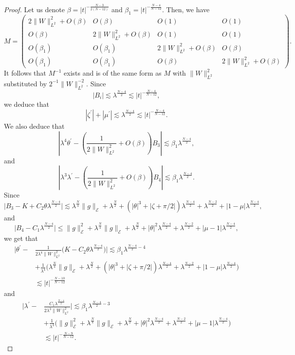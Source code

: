 \documentclass[a4paper,two-side,10pt]{amsart}
\numberwithin{equation}{section}
\begin{document}
\begin{proof}
Let us denote $\beta=|t|^{-\frac{N-3}{2(N-12)}}$ and $\beta_1=|t|^{-\frac{N-4}{N-12}}$.
Then, we have
$$M=\begin{pmatrix}2\|W\|_{L^2}^2 +O(\beta) & O(\beta) & O(1) & O(1)\\ O(\beta) & 2\|W\|_{L^2}^2 +O(\beta) & O(1) & O(1)\\ O(\beta_1) &O(\beta_1) & 2\|W\|_{L^2}^2+O(\beta) & O(\beta) \\ O(\beta_1) & O(\beta_1) &O(\beta) &   2\|W\|_{L^2}^2+O(\beta)  \end{pmatrix}.$$
It follows that $M^{-1}$ exists and is of the same form as $M$ with $\|W\|_{L^2}^2$ substituted by $2^{-1}\|W\|_{L^2}^{-2}$. Since 
$$|B_i| \lesssim \lambda^{\frac{N-4}{2}}
\lesssim  |t|^{-\frac{N-4}{N-12}},$$
we deduce that 
\begin{equation}\label{zetamu}
|\zeta^\prime| +|\mu^\prime|\lesssim \lambda^{\frac{N-4}{2}}\lesssim |t|^{-\frac{N-4}{N-12}}.
\end{equation}
 We also deduce that
$$\left|\lambda^4 \theta^\prime - \left(\frac{1}{2\|W\|_{L^2}^2} +O(\beta)\right) B_3 \right|\lesssim \beta_1 \lambda^{\frac{N-4}{2}},$$
and
$$\left|\lambda^3 \lambda^\prime - \left(\frac{1}{2\|W\|_{L^2}^2} +O(\beta)\right) B_4 \right|\lesssim \beta_1 \lambda^{\frac{N-4}{2}}.$$
Since 
$$\big|B_3 - K+ C_2 \theta \lambda^{\frac{N-4}{2}}\big| \lesssim  \lambda^{\frac{N}{4} } \|g\|_{\mathcal{E}} +\lambda^{\frac{N}{2}}+  ( |\theta|^3 + |\zeta +\pi /2| ) \lambda^{\frac{N-4}{2}} +  \lambda^{\frac{N-2}{2}} +|1-\mu| \lambda^{\frac{N-4}{2}},$$
 and
$$\big|B_4- C_1 \lambda^{\frac{N-4}{2}}\big|\leq \|g\|^2_{\mathcal{E}} + \lambda^{\frac{N}{4}} \|g\|_{\mathcal{E}}+ \lambda^{\frac{N}{2}}+ |\theta|^2 \lambda^{\frac{N-4}{2}}+\lambda^{\frac{N-2}{2}} + |\mu -1| \lambda^{\frac{N-4}{2}},$$ 
we get that
\begin{align*}
\Big|\theta^\prime -&\frac{1}{2\lambda^4 \|W\|_{L^2}^2} \big(K- C_2 \theta \lambda^{\frac{N-4}{2}}\big) \Big| \lesssim \beta_1 \lambda^{\frac{N-4}{2} -4}\\
&+  \frac{1}{\lambda^4}\big(\lambda^{\frac{N}{4} } \|g\|_{\mathcal{E}} +\lambda^{\frac{N}{2}}+  ( |\theta|^3 + |\zeta +\pi /2| ) \lambda^{\frac{N-4}{2}} +  \lambda^{\frac{N-2}{2}} +|1-\mu| \lambda^{\frac{N-4}{2}} \big)  \\
&\lesssim |t|^{-\frac{N-10}{N-12}}
\end{align*}
and
\begin{align*}
\Big|\lambda^\prime -& \frac{C_1\lambda^{\frac{N-4}{2}}}{2\lambda^3 \|W\|_{L^2}^2} \Big| \lesssim \beta_1 \lambda^{\frac{N-4}{2}-3}\\
&+\frac{1}{\lambda^3} \big(\|g\|^2_{\mathcal{E}} + \lambda^{\frac{N}{4}} \|g\|_{\mathcal{E}}+ \lambda^{\frac{N}{2}}+ |\theta|^2 \lambda^{\frac{N-4}{2}}+\lambda^{\frac{N-2}{2}} + |\mu -1| \lambda^{\frac{N-4}{2}}\big)\\
&\lesssim |t|^{-\frac{N-9}{N-12}}.
\end{align*}

\end{proof}
\end{document}
